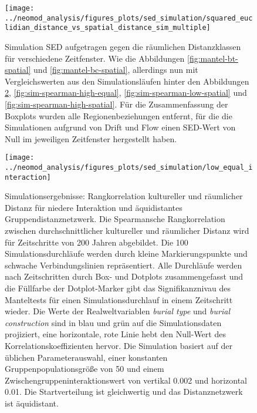 \documentclass[openany,twoside,twocolumn]{book}
\begin{document}
\begin{landscape}
\begin{figure}
\texttt{[image: ../neomod\_analysis/figures\_plots/sed\_simulation/squared\_euclidian\_distance\_vs\_spatial\_distance\_sim\_multiple]} \caption[Simulation SED aufgetragen gegen die räumlichen Distanzklassen]{Simulation SED aufgetragen gegen die räumlichen Distanzklassen für verschiedene Zeitfenster. Wie die Abbildungen \ref{fig:mantel-bt-spatial} und \ref{fig:mantel-bc-spatial}, allerdings nun mit Vergleichswerten aus den Simulationsläufen hinter den Abbildungen \ref{fig:sim-spearman-low-equal}, \ref{fig:sim-spearman-high-equal}, \ref{fig:sim-spearman-low-spatial} und \ref{fig:sim-spearman-high-spatial}. Für die Zusammenfassung der Boxplots wurden alle Regionenbeziehungen entfernt, für die die Simulationen aufgrund von Drift und Flow einen SED-Wert von Null im jeweiligen Zeitfenster hergestellt haben.}\label{fig:sim-sed}
\end{figure}
\end{landscape}

\begin{figure}
\texttt{[image: ../neomod\_analysis/figures\_plots/sed\_simulation/low\_equal\_interaction]} \caption[Simulationsergebnisse: Rangkorrelation kultureller und räumlicher Distanz für niedere Interaktion und äquidistantes Gruppendistanznetzwerk]{Simulationsergebnisse: Rangkorrelation kultureller und räumlicher Distanz für niedere Interaktion und äquidistantes Gruppendistanznetzwerk. Die Spearmansche Rangkorrelation zwischen durchschnittlicher kultureller und räumlicher Distanz wird für Zeitschritte von 200 Jahren abgebildet. Die 100 Simulationsdurchläufe werden durch kleine Markierungspunkte und schwache Verbindungslinien repräsentiert. Alle Durchläufe werden nach Zeitschritten durch Box- und Dotplots zusammengefasst und die Füllfarbe der Dotplot-Marker gibt das Signifikanznivau des Manteltests für einen Simulationsdurchlauf in einem Zeitschritt wieder. Die Werte der Realweltvariablen \textit{burial type} und \textit{burial construction} sind in blau und grün auf die Simulationsdaten projiziert, eine horizontale, rote Linie hebt den Null-Wert des Korrelationskoeffizienten hervor. Die Simulation basiert auf der üblichen Parameterauswahl, einer konstanten Gruppenpopulationsgröße von 50 und einem Zwischengruppeninteraktionswert von vertikal 0.002 und horizontal 0.01. Die Startverteilung ist gleichwertig und das Distanznetzwerk ist äquidistant.}\label{fig:sim-spearman-low-equal}
\end{figure}
\end{document}
